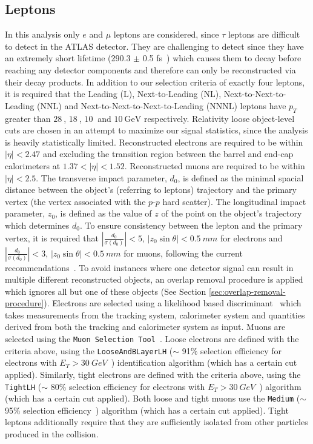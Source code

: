 \subsection{Leptons}
\label{sec:lepton-object}
In this analysis only $e$ and $\mu$ leptons are considered, since $\tau$ leptons are difficult to detect in the ATLAS detector. They are challenging to detect since they have an extremely short lifetime (290.3 $\pm$ 0.5 fs~\cite{pdg}) which causes them to decay before reaching any detector components and therefore can only be reconstructed via their decay products. In addition to our selection criteria of exactly four leptons, it is required that the Leading (L), Next-to-Leading (NL), Next-to-Next-to-Leading (NNL) and Next-to-Next-to-Next-to-Leading (NNNL) leptons have $p_{T}$ greater than $\SI{28}{}$, $\SI{18}{}$, $\SI{10}{}$ and $\SI{10}{\GeV}$ respectively. Relativity loose object-level cuts are chosen in an attempt to maximize our signal statistics, since the analysis is heavily statistically limited. Reconstructed electrons are required to be within $|\eta| < 2.47$ and excluding the transition region between the barrel and end-cap calorimeters at $1.37 < |\eta| < 1.52$. Reconstructed muons are required to be within $|\eta| < 2.5$. The transverse impact parameter, $d_{0}$, is defined as the minimal spacial distance between the object's (referring to leptons) trajectory and the primary vertex (the vertex associated with the $p$-$p$ hard scatter). The longitudinal impact parameter, $z_{0}$, is defined as the value of $z$ of the point on the object's trajectory which determines $d_{0}$. To ensure consistency between the lepton and the primary vertex, it is required that $|\frac{d_{0}}{\sigma(d_{0})}| < 5$, $|z_{0}\sin{\theta}| < \SI{0.5}{mm}$ for electrons and $|\frac{d_{0}}{\sigma(d_{0})}| < 3$, $|z_{0}\sin{\theta}| < \SI{0.5}{mm}$ for muons, following the current recommendations~\cite{TopRecoObjTwikiModel}. To avoid instances where one detector signal can result in multiple different reconstructed objects, an overlap removal procedure is applied which ignores all but one of these objects (See Section \ref{sec:overlap-removal-procedure}). Electrons are selected using a likelihood based discriminant~\cite{electronRecoAndID:paper} which takes measurements from the tracking system, calorimeter system and quantities derived from both the tracking and calorimeter system as input. Muons are selected using the \texttt{Muon Selection Tool}~\cite{muon-selection-tool}. Loose electrons are defined with the criteria above, using the \texttt{LooseAndBLayerLH} ($\sim$ 91$\%$ selection efficiency for electrons with $E_{T} > \SI{30}{GeV}$~\cite{electronIDefficiency}) identification algorithm (which has a certain cut applied). Similarly, tight electrons are defined with the criteria above, using the \texttt{TightLH} ($\sim$ 80$\%$ selection efficiency for electrons with $E_{T} > \SI{30}{GeV}$~\cite{electronIDefficiency}) algorithm (which has a certain cut applied). Both loose and tight muons use the \texttt{Medium} ($\sim$ 95$\%$ selection efficiency~\cite{muonIDEfficiency}) algorithm (which has a certain cut applied). Tight leptons additionally require that they are sufficiently isolated from other particles produced in the collision. 